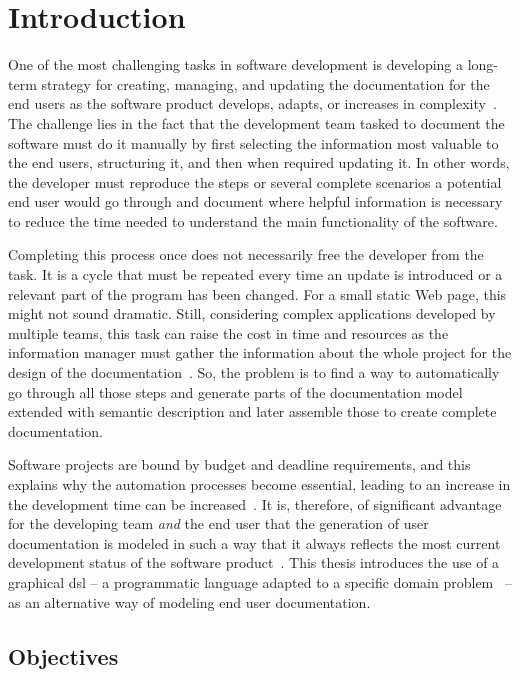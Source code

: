 \chapter{Introduction}\label{ch:intro}

One of the most challenging tasks in software development is developing a long-term strategy for creating, managing, and updating the documentation for the end users as the software product develops, adapts, or increases in complexity~\cite{ieee6081814}. The challenge lies in the fact that the development team tasked to document the software must do it manually by first selecting the information most valuable to the end users, structuring it, and then when required updating it. In other words, the developer must reproduce the steps or several complete scenarios a potential end user would go through and document where helpful information is necessary to reduce the time needed to understand the main functionality of the software. 

Completing this process once does not necessarily free the developer from the task. It is a cycle that must be repeated every time an update is introduced or a relevant part of the program has been changed. For a small static Web page, this might not sound dramatic. Still, considering complex applications developed by multiple teams, this task can raise the cost in time and resources as the information manager must gather the information about the whole project for the design of the documentation~\cite{ieee5712775}. So, the problem is to find a way to automatically go through all those steps and generate parts of the documentation model extended with semantic description and later assemble those to create complete documentation.

Software projects are bound by budget and deadline requirements, and this explains why the automation processes become essential, leading to an increase in the development time can be increased~\cite{despa2014comparative}. It is, therefore, of significant advantage for the developing team \textit{and} the end user that the generation of user documentation is modeled in such a way that it always reflects the most current development status of the software product~\cite{waits_et_al}. This thesis introduces the use of a graphical \gls{dsl} -- a programmatic language adapted to a specific domain problem~\cite{perez-et_al} -- as an alternative way of modeling end user documentation.

\section{Objectives}\label{sec:objectives}

